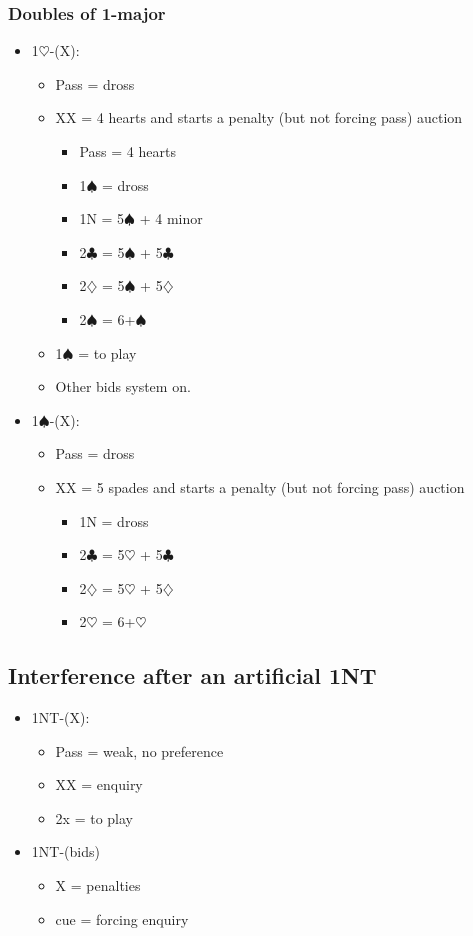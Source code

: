 \documentclass[a4paper,14pt]{extarticle}
\begin{document}
\subsubsection{Doubles of 1-major}
\label{sec:intf:1M}

\begin{itemize}
\item 1$\heartsuit$-(X):
	\begin{itemize}
	\item Pass = dross
	\item XX = 4 hearts and starts a penalty (but not forcing pass) auction
		\begin{itemize}
		\item Pass = 4 hearts
		\item 1$\spadesuit$ = dross
		\item 1N = 5$\spadesuit$ + 4 minor
		\item 2$\clubsuit$ = 5$\spadesuit$ + 5$\clubsuit$
		\item 2$\diamondsuit$ = 5$\spadesuit$ + 5$\diamondsuit$
		\item 2$\spadesuit$ = 6+$\spadesuit$
		\end{itemize}
	\item 1$\spadesuit$ = to play
	\item Other bids system on.
	\end{itemize}
\newpage
\item 1$\spadesuit$-(X):
	\begin{itemize}
	\item Pass = dross
	\item XX = 5 spades and starts a penalty (but not forcing pass) auction
		\begin{itemize}
		\item 1N = dross
		\item 2$\clubsuit$ = 5$\heartsuit$ + 5$\clubsuit$
		\item 2$\diamondsuit$ = 5$\heartsuit$ + 5$\diamondsuit$
		\item 2$\heartsuit$ = 6+$\heartsuit$
		\end{itemize}
	\end{itemize}
\end{itemize}

\subsection{Interference after an artificial 1NT}
\label{sec:intf:1N}

\begin{itemize}
\item 1NT-(X):
	\begin{itemize}
	\item Pass = weak, no preference
	\item XX = enquiry
	\item 2x = to play
	\end{itemize}
\item 1NT-(bids)
	\begin{itemize}
	\item X = penalties
	\item cue = forcing enquiry
	\end{itemize}
\end{itemize}
\end{document}
